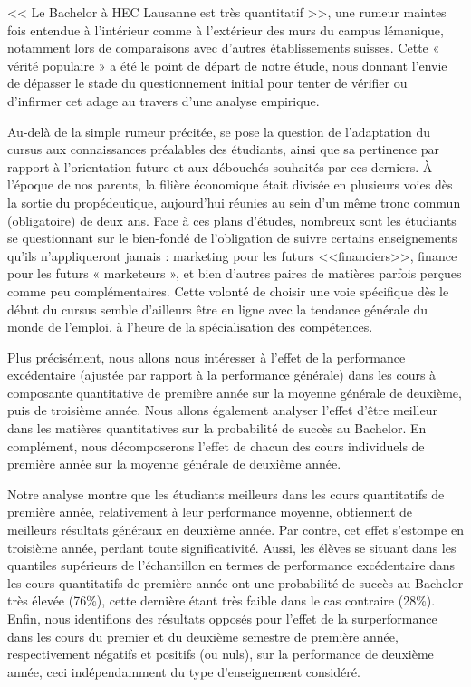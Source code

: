 

<< Le Bachelor à HEC Lausanne est très quantitatif >>, une rumeur maintes fois entendue à l’intérieur comme à l’extérieur des murs du campus lémanique, notamment lors de comparaisons avec d’autres établissements suisses. Cette « vérité populaire » a été le point de départ de notre étude, nous donnant l’envie de dépasser le stade du questionnement initial pour tenter de vérifier ou d’infirmer cet adage au travers d’une analyse empirique.

Au-delà de la simple rumeur précitée, se pose la question de l’adaptation du cursus aux connaissances préalables des étudiants, ainsi que sa pertinence par rapport à l’orientation future et aux débouchés souhaités par ces derniers. À l’époque de nos parents, la filière économique était divisée en plusieurs voies dès la sortie du propédeutique, aujourd’hui réunies au sein d’un même tronc commun (obligatoire) de deux ans. Face à ces plans d'études, nombreux sont les étudiants se questionnant sur le bien-fondé de l’obligation de suivre certains enseignements qu’ils n’appliqueront jamais : marketing pour les futurs <<financiers>>, finance pour les futurs « marketeurs », et bien d’autres paires de matières parfois perçues comme peu complémentaires. Cette volonté de choisir une voie spécifique dès le début du cursus semble d’ailleurs être en ligne avec la tendance générale du monde de l’emploi, à l’heure de la spécialisation des compétences.

Plus précisément, nous allons nous intéresser à l’effet de la performance excédentaire (ajustée par rapport à la performance générale) dans les cours à composante quantitative de première année sur la moyenne générale de deuxième, puis de troisième année. Nous allons également analyser l’effet d’être meilleur dans les matières quantitatives sur la probabilité de succès au Bachelor. En complément, nous décomposerons l’effet de chacun des cours individuels de première année sur la moyenne générale de deuxième année.

Notre analyse montre que les étudiants meilleurs dans les cours quantitatifs de première année, relativement à leur performance moyenne, obtiennent de meilleurs résultats généraux en deuxième année. Par contre, cet effet s’estompe en troisième année, perdant toute significativité. Aussi, les élèves se situant dans les quantiles supérieurs de l’échantillon en termes de performance excédentaire dans les cours quantitatifs de première année ont une probabilité de succès au Bachelor très élevée (76\%), cette dernière étant très faible dans le cas contraire (28\%). Enfin, nous identifions des résultats opposés pour l’effet de la surperformance dans les cours du premier et du deuxième semestre de première année, respectivement négatifs et positifs (ou nuls), sur la performance de deuxième année, ceci indépendamment du type d’enseignement considéré.


